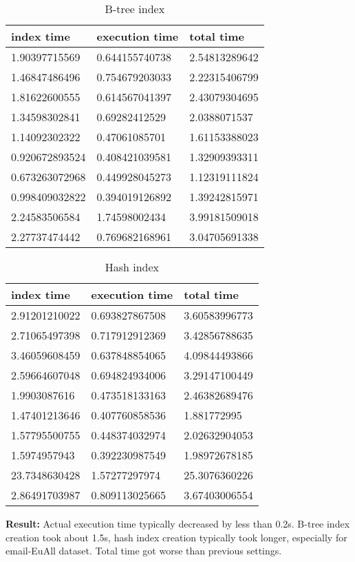 \begin{itemize*}
\begin{table}[H]
\begin{center}
\begin{tabular}{|l|l|l|}
\hline
index time & execution time & total time                \\ \hline
1.90397715569  & 0.644155740738 & 2.54813289642 \\ \hline
1.46847486496  & 0.754679203033 & 2.22315406799 \\ \hline
1.81622600555  & 0.614567041397 & 2.43079304695 \\ \hline
1.34598302841  & 0.69282412529  & 2.0388071537  \\ \hline
1.14092302322  & 0.47061085701  & 1.61153388023 \\ \hline
0.920672893524 & 0.408421039581 & 1.32909393311 \\ \hline
0.673263072968 & 0.449928045273 & 1.12319111824 \\ \hline
0.998409032822 & 0.394019126892 & 1.39242815971 \\ \hline
2.24583506584  & 1.74598002434  & 3.99181509018 \\ \hline
2.27737474442  & 0.769682168961 & 3.04705691338 \\ \hline
\end{tabular}
\end{center}
\caption{B-tree index}
\end{table}

\begin{table}[H]
\begin{center}
\begin{tabular}{|l|l|l|}
\hline
index time & execution time & total time     \\ \hline
2.91201210022 & 0.693827867508 & 3.60583996773 \\ \hline
2.71065497398 & 0.717912912369 & 3.42856788635 \\ \hline
3.46059608459 & 0.637848854065 & 4.09844493866 \\ \hline
2.59664607048 & 0.694824934006 & 3.29147100449 \\ \hline
1.9903087616  & 0.473518133163 & 2.46382689476 \\ \hline
1.47401213646 & 0.407760858536 & 1.881772995   \\ \hline
1.57795500755 & 0.448374032974 & 2.02632904053 \\ \hline
1.5974957943  & 0.392230987549 & 1.98972678185 \\ \hline
23.7348630428 & 1.57277297974  & 25.3076360226 \\ \hline
2.86491703987 & 0.809113025665 & 3.67403006554 \\ \hline
\end{tabular}
\end{center}
\caption{Hash index}
\end{table}

\par \textbf{Result:} Actual execution time typically decreased by less than 0.2s. B-tree index creation took about 1.5s, hash index creation typically took longer, especially for email-EuAll dataset. Total time got worse than previous settings.
\end{itemize*}
